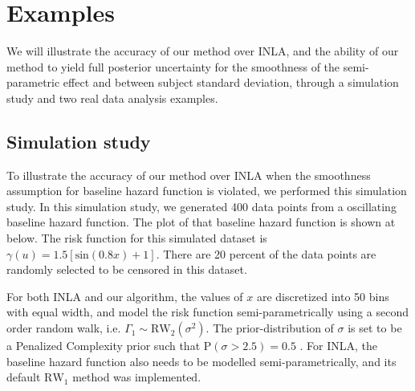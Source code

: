 \documentclass[]{article}
\begin{document}
\section{Examples}\label{sec:example}

We will illustrate the accuracy of our method over INLA, and the ability of our method to yield full posterior uncertainty for the smoothness of the semi-parametric effect and between subject standard deviation, through a simulation study and two real data analysis examples.

\subsection{Simulation study}

To illustrate the accuracy of our method over INLA when the smoothness assumption for baseline hazard function is violated, we performed this simulation study. In this simulation study, we generated 400 data points from a oscillating baseline hazard function. The plot of that baseline hazard function is shown at below. The risk function for this simulated dataset is $\gamma(u) = 1.5 [ \text{sin}(0.8x) + 1 ]$. There are 20 percent of the data points are randomly selected to be censored in this dataset.

For both INLA and our algorithm, the values of $x$ are discretized into 50 bins with equal width, and model the risk function semi-parametrically using a second order random walk, i.e. $\Gamma_1 \sim \text{RW}_2(\sigma^2)$. The prior-distribution of $\sigma$ is set to be a Penalized Complexity prior such that $\text{P}(\sigma > 2.5)  = 0.5$ \citep{pcprior}. For INLA, the baseline hazard function also needs to be modelled semi-parametrically, and its default $\text{RW}_1$ method was implemented.
\end{document}
